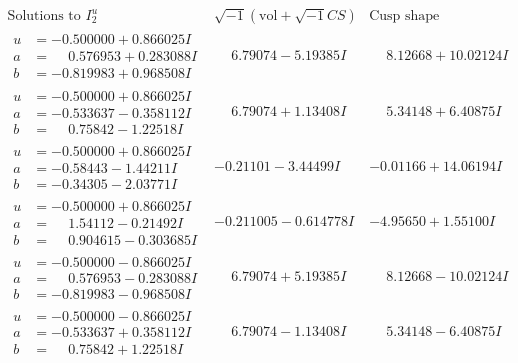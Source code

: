 \documentclass[1p]{elsarticle_modified}
\theoremstyle{definition}
\newcommand{\I}{\sqrt{-1}}
\begin{document}
$$\begin{array}{c|c|c}  
\text{Solutions to }I^u_{2}& \I (\text{vol} + \sqrt{-1}CS) & \text{Cusp shape}\\
 \hline 
\begin{aligned}
u &= -0.500000 + 0.866025 I \\
a &= \phantom{-}0.576953 + 0.283088 I \\
b &= -0.819983 + 0.968508 I\end{aligned}
 & \phantom{-}6.79074 - 5.19385 I & \phantom{-}8.12668 + 10.02124 I \\ \hline\begin{aligned}
u &= -0.500000 + 0.866025 I \\
a &= -0.533637 - 0.358112 I \\
b &= \phantom{-}0.75842 - 1.22518 I\end{aligned}
 & \phantom{-}6.79074 + 1.13408 I & \phantom{-}5.34148 + 6.40875 I \\ \hline\begin{aligned}
u &= -0.500000 + 0.866025 I \\
a &= -0.58443 - 1.44211 I \\
b &= -0.34305 - 2.03771 I\end{aligned}
 & -0.21101 - 3.44499 I & -0.01166 + 14.06194 I \\ \hline\begin{aligned}
u &= -0.500000 + 0.866025 I \\
a &= \phantom{-}1.54112 - 0.21492 I \\
b &= \phantom{-}0.904615 - 0.303685 I\end{aligned}
 & -0.211005 - 0.614778 I & -4.95650 + 1.55100 I \\ \hline\begin{aligned}
u &= -0.500000 - 0.866025 I \\
a &= \phantom{-}0.576953 - 0.283088 I \\
b &= -0.819983 - 0.968508 I\end{aligned}
 & \phantom{-}6.79074 + 5.19385 I & \phantom{-}8.12668 - 10.02124 I \\ \hline\begin{aligned}
u &= -0.500000 - 0.866025 I \\
a &= -0.533637 + 0.358112 I \\
b &= \phantom{-}0.75842 + 1.22518 I\end{aligned}
 & \phantom{-}6.79074 - 1.13408 I & \phantom{-}5.34148 - 6.40875 I \\ \hline\begin{aligned}

\end{aligned}
\end{array}$$
\end{document}
